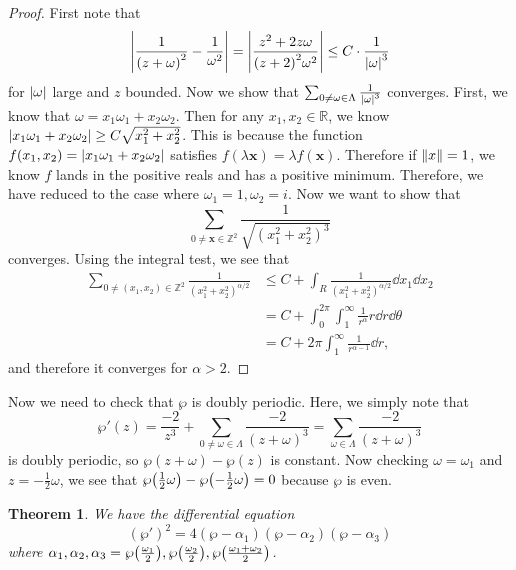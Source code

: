 \documentclass[leqno, openany]{memoir}
\newtheorem{thm}{Theorem}[section]
\theoremstyle{definition}
\theoremstyle{remark}
\theoremstyle{plain}
\theoremstyle{definition}
\theoremstyle{remark}
\newcommand{\R}{\mathbb{R}}
\newcommand{\Z}{\mathbb{Z}}
\begin{document}
\begin{proof}
    First note that
    \[ \abs{\frac{1}{{(z+\omega)}^2} - \frac{1}{\omega^2}} = \abs{\frac{z^2 + 2z\omega}{{(z+2)}^2 \omega^2}} \leq C \cdot \frac{1}{\abs{\omega}^3} \]
    for $\abs{\omega}$ large and $z$ bounded. Now we show that $\sum_{0 \neq \omega \in \Lambda} \frac{1}{\abs{\omega}^3}$ converges. First, we know that $\omega = x_1 \omega_1 + x_2 \omega_2$. Then for any $x_1, x_2 \in \R$, we know $\abs{x_1 \omega_1 + x_2 \omega_2} \geq C \sqrt{x_1^2 + x_2^2}$. This is because the function $f(x_1, x_2) = \abs{x_1 \omega_1 + x_2 \omega_2}$ satisfies $f(\lambda \mathbf{x}) = \lambda f(\mathbf{x})$. Therefore if $\norm{x} = 1$, we know $f$ lands in the positive reals and has a positive minimum. Therefore, we have reduced to the case where $\omega_1 = 1, \omega_2 = i$. Now we want to show that
    \[ \sum_{0 \neq \mathbf{x} \in \Z^2} \frac{1}{\sqrt{{(x_1^2 + x_2^2)}^3}} \]
    converges. Using the integral test, we see that
    \begin{align*}
        \sum_{0 \neq (x_1, x_2) \in \Z^2} \frac{1}{{(x_1^2 + x_2^2)}^{\alpha/2}} &\leq C + \int_R \frac{1}{{(x_1^2 + x_2^2)}^{\alpha/2}} \dd{x_1} \dd{x_2} \\
                                                                                 &= C + \int_{0}^{2\pi} \int_1^{\infty} \frac{1}{r^{\alpha}} r \dd{r} \dd{\theta} \\
                                                                                 &= C + 2 \pi \int_1^{\infty} \frac{1}{r^{\alpha - 1}} \dd{r},
    \end{align*}
    and therefore it converges for $\alpha > 2$.
\end{proof}

Now we need to check that $\wp$ is doubly periodic. Here, we simply note that
\[ \wp'(z) = \frac{-2}{z^3} + \sum_{0 \neq \omega \in \Lambda} \frac{-2}{{(z+\omega)}^3} = \sum_{\omega \in \Lambda} \frac{-2}{{(z+\omega)}^3} \]
is doubly periodic, so $\wp(z+\omega) - \wp(z)$ is constant. Now checking $\omega = \omega_1$ and $z = - \frac{1}{2} \omega$, we see that $\wp\qty(\frac{1}{2} \omega) - \wp\qty(-\frac{1}{2} \omega) = 0$ because $\wp$ is even.

\begin{thm}
    We have the differential equation
    \[ {(\wp')}^2 = 4(\wp - \alpha_1)(\wp - \alpha_2)(\wp-\alpha_3) \]
    where $\alpha_1, \alpha_2, \alpha_3 = \wp\qty(\frac{\omega_1}{2}), \wp\qty(\frac{\omega_2}{2}), \wp\qty(\frac{\omega_1 + \omega_2}{2})$.
\end{thm}
\end{document}
